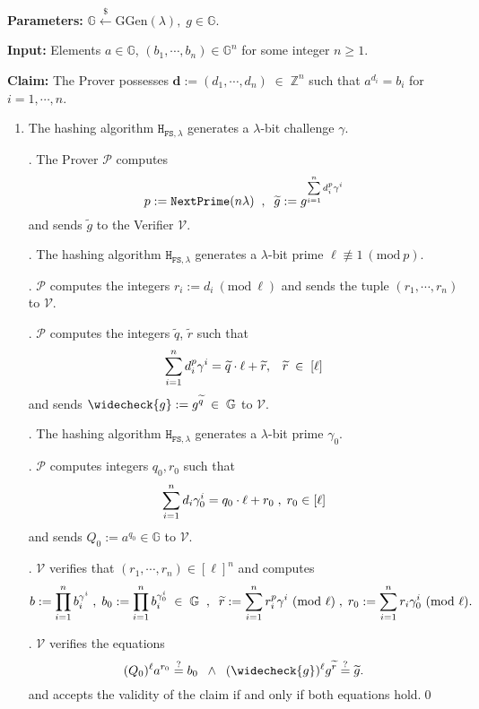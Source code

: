 \documentclass[11pt, lettersize, notitlepage, leqno, footskip=0.6cm]{article}
\newcommand{\bz}{\mathbb Z}
\newcommand{\pl}{\prod\limits}
\newcommand{\slim}{\sum\limits}
\newcommand{\ttt}{\texttt}
\newcommand{\bG}{\mathbb{G}}
\newcommand{\wti}{\widetilde}
\newcommand{\mc}{\mathcal}
\newcommand{\mb}{\mathbb}
\newcommand{\mbf}{\mathbf}
\newcommand{\mr}{\mathrm}
\newcommand{\lam}{\lambda}
\newcommand{\lamb}{\lambda}
\newcommand{\weck}{\widecheck}
\newcommand{\mP}{\mc{P}}
\newcommand{\V}{\mc{V}}
\newcommand{\vs}{\vspace{-0.15cm}}
\newcommand{\noin}{\noindent}
\newcommand{\sta}{\stackrel{?}{=}}
\newcommand{\Mod}[1]{\ (\mathrm{mod}\ #1)}
\newtheorem{Prot}[Thm]{Protocol}
\numberwithin{equation}{section}
\begin{document}
 \vspace{-0.3cm}

\noin \textbf{Parameters:} $\mb{G}\xleftarrow{\$} \mr{GGen}(\lamb), \; g\in \mb{G}$.

\noin \textbf{Input:} Elements $a\in\mb{G} $, $(b_1,\cdots,b_n)\in \mb{G}^n$ for some integer $n\geq 1$.

\noin \textbf{Claim:} The Prover possesses $\mbf{d}:= (d_1,\cdots, d_n)\;\in\;\bz^n$ such that $a^{d_i} = b_i$ for $i = 1,\cdots, n$.

\begin{enumerate}[wide, labelwidth=!, labelindent=0pt]\vs \item \normalfont The hashing algorithm ${\ttt{H}}_{{\ttt{FS}},\lam}$ generates a $\lam$-bit challenge $\gamma$.

\noin 2. The Prover $\mc{P}$ computes \vspace{-0.25cm} $$p:= \ttt{NextPrime}(n\lam)\;\;,\;\;\wti{g} := g^{\sum\limits_{i=1}^n d_i^{p}\gamma^i}\vs $$ and sends $\wti{g}$ to the Verifier $\mc{V}$.


\noin 3. The hashing algorithm $\ttt{H}_{\ttt{FS},\lam}$ generates a $\lam$-bit prime $\ell\not\equiv 1\Mod{p}$. 

\noin 4. $\mc{P}$ computes the integers $r_i:= d_i\Mod{\ell}$ and sends the tuple $(r_1,\cdots,r_n)$ to $\V$.

\noin 5. $\mP$ computes the integers $\wti{q}$, $\wti{r}$ such that \vs $$\slim_{i=1}^n d_i^{p}\gamma^i = \wti{q} \cdot \ell+\wti{r},\;\;\;\wti{r}\;\in\;[\ell]\vs $$ and sends $\weck{g}:= g^{\wti{q}}\;\in\;\bG$ to $\V$.

\noin 6. The hashing algorithm $\ttt{H}_{\ttt{FS},\lam}$ generates a $\lam$-bit prime $\gamma_{0}$.

\noin 7. $\mP$ computes integers $q_0, r_0$ such that \vs $$\slim_{i=1}^n d_i\gamma_{0}^i = q_0 \cdot \ell+r_0\;,\;r_0\in[\ell] \vs $$ and sends $Q_0:= a^{q_0}\in \bG$ to $\V.$

\noin 8. $\mc{V}$ verifies that $(r_1,\cdots,r_n)\in [\ell]^n$ and computes \vs $$b := \pl_{i=1}^n b_i^{\gamma^i}\;,\;b_0 := \pl_{i=1}^n b_i^{\gamma_{0}^i}\;\in \;\bG\;\;,\;\;\wti{r}:= \slim_{i=1}^n r_i^{p}\gamma^i\Mod{\ell}\;,\;r_0:=\slim_{i=1}^n r_i\gamma_{0}^i\Mod{\ell}. \vs $$ 

\noin 9. $\V$ verifies the equations \vs $$(Q_0)^{\ell}a^{r_0}\sta b_0\;\;\wedge\;\; (\weck{g})^{\ell}g^{\wti{r}}\sta\wti{g}.$$ and accepts the validity of the claim if and only if both equations hold.\qed  \end{enumerate}
\end{document}
